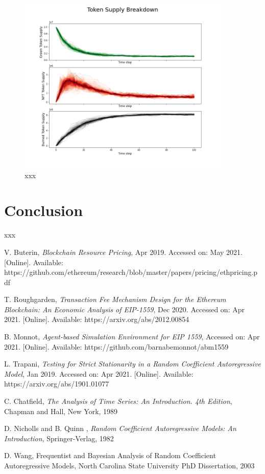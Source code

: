 \documentclass{article}
\begin{document}
\begin{figure}
\centering
\includegraphics[width=4in]{token_supply_sims.png}
\caption{xxx} 
\label{fig:eda}
\end{figure} 


\section{Conclusion}
\label{section:conclusion}

xxx

\begin{thebibliography}{1}

 V. Buterin,  \textit{Blockchain Resource Pricing}, Apr 2019. Accessed on: May 2021. [Online]. Available: https://github.com/ethereum/research/blob/master/papers/pricing/ethpricing.pdf

 T. Roughgarden, \textit{Transaction Fee Mechanism Design for the Ethereum Blockchain: An Economic Analysis of EIP-1559}, Dec 2020. Accessed on: Apr 2021. [Online]. Available: https://arxiv.org/abs/2012.00854

 B. Monnot, \textit{Agent-based Simulation Environment for EIP 1559}, Accessed on: Apr 2021.  [Online]. Available:  https://github.com/barnabemonnot/abm1559

 L. Trapani, \textit{Testing for Strict Stationarity in a Random Coefficient Autoregressive Model}, Jan 2019. Accessed on: Apr 2021. [Online]. Available: https://arxiv.org/abs/1901.01077

 C. Chatfield, \textit{The Analysis of Time Series: An Introduction. 4th Edition}, Chapman and Hall, New York, 1989

 D. Nicholls and B. Quinn , \textit{Random Coefficient Autoregressive Models: An Introduction}, Springer-Verlag, 1982

 D. Wang, Frequentist and Bayesian Analysis of Random Coefficient Autoregressive Models, North Carolina State University PhD Dissertation, 2003



\end{thebibliography}
\end{document}
